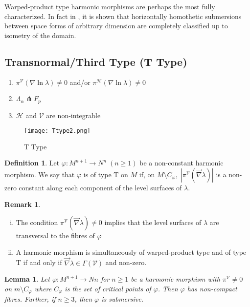 \documentclass[12pt]{article}
\newtheorem{lemma}[theorem]{Lemma}
\theoremstyle{definition}
\newtheorem{definition}{Definition}[section]
\newtheorem{remark}{Remark}[subsection]
\numberwithin{equation}{subsection}
\begin{document}
Warped-product type harmonic morphisms are perhaps the most fully characterized. In fact in \cite{Gudmund}, it is shown that horizontally homothetic submersions between space forms of arbitrary dimension are completely classified up to isometry of the domain.
\subsection{Transnormal/Third Type (T Type)}
\begin{enumerate}
    \item $\pi^\mathcal{V}(\nabla \ln \lambda) \neq 0$ and/or $\pi^\mathcal{H}(\nabla \ln \lambda) \neq 0$  
    \item  $\Lambda_\alpha \pitchfork F_p$
    \item $\mathcal{H}$ and $\mathcal{V}$ are non-integrable
\end{enumerate}
    \begin{figure}[H]
    \centering
    \texttt{[image: Ttype2.png]}
    \caption{T Type}
    \label{fig:T Type}
    \end{figure}

\begin{definition}
Let $\varphi: M^{n+1} \rightarrow N^n \; (n \geq 1)$ be a non-constant harmonic morphism. We say that $\varphi$ is of type T on $M$ if, on $M \setminus C_\varphi, \; \left| \pi^\mathcal{V}(\vec{\nabla} \lambda) \right|$ is a non-zero constant along each component of the level surfaces of $\lambda$.
\end{definition}

\begin{remark}
\begin{enumerate}[(i)]
    \item The condition $\pi^\mathcal{V}(\vec{\nabla} \lambda) \neq 0$ implies that the level surfaces of $\lambda$ are transversal to the fibres of $\varphi$
    \item A harmonic morphism is simultaneously of warped-product type and of type T if and only if $\vec{\nabla} \lambda \in \Gamma(\mathcal{V})$ and non-zero.
\end{enumerate}
\end{remark}

\begin{lemma}
Let $\varphi: M^{n+1} \rightarrow N{n}$ for $n \geq 1$ be a harmonic morphism with $\pi^{\mathcal{V}} \neq 0$ on $m \setminus C_\varphi$ where $C_\varphi$ is the set of critical points of $\varphi$. Then $\varphi$ has non-compact fibres. Further, if $n \geq 3$, then $\varphi$ is submersive. 
\end{lemma}
\end{document}
